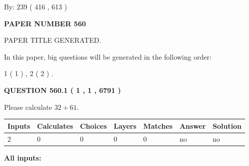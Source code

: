 \documentclass[12pt]{article}
\begin{document}
   
\hspace{1.0in} By: 
 239 ( 416 ,  613 )
   
   
   
   
\newpage 
\setcounter{page}{ 
   560001 } 
   
   
   
   
 {\textbf{ \Large{ PAPER NUMBER  560  }}}
   
   
\vspace{0.2in}
   
   
   
   
   
   
   
   
 \vspace{0.2in}
 
 
 
 
   
   
 PAPER TITLE GENERATED.
   
   
   
\vspace{0.2in}
   
In this paper, big questions will be generated in the following order: 
   
   
   1 ( 1 )
 ,
   2 ( 2 )
 .
  
\vspace{0.2in}
  
{\textbf{\Large{QUESTION
560.1 
 ( 1 , 1 , 6791 )
}}}
  
  
 
Please calculate $ %
32 +  %
61 $.
 
 
   
   
   
   
\noindent\begin{tabular}{|l|l|l|l|l|l|l|}
 \hline
Inputs & Calculates & Choices & Layers & Matches & Answer & Solution \\ \hline
 2  & 
 0  & 
 0
  & 
 0  & 
 0  & 
  no & 
  no 
  \\ \hline
 \end{tabular}
   
   
   
   
\noindent{}
   
   
   
   
\noindent\vspace{0.1in}\hspace{-0.08in} {\textbf{\Large{All inputs: }}}
   
\end{document}
